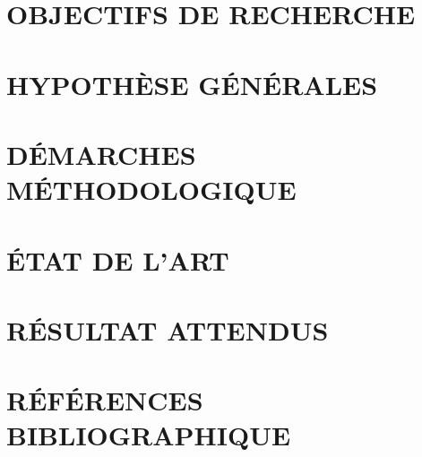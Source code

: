 \documentclass[a4paper,12pt]{article}
\begin{document}
\section[Objectifs de recherche]{OBJECTIFS DE RECHERCHE}

\section[Hyposthèses générales]{HYPOTHÈSE GÉNÉRALES}

\section[Démarches méthodologiques]{DÉMARCHES MÉTHODOLOGIQUE}

\section[Etat de l'art]{ÉTAT DE L’ART}

\section[Résultats attenus]{RÉSULTAT ATTENDUS}

\section[Références bibliographiques]{RÉFÉRENCES BIBLIOGRAPHIQUE}
\end{document}
